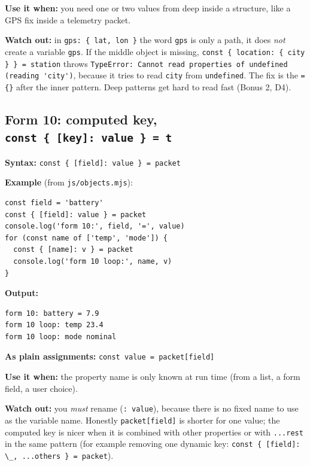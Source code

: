 \textbf{Use it when:} you need one or two values from deep inside a structure, like a GPS fix inside a telemetry packet.

\textbf{Watch out:} in \passthrough{\lstinline!gps: \{ lat, lon \}!} the word \passthrough{\lstinline!gps!} is only a path, it does \emph{not} create a variable \passthrough{\lstinline!gps!}. If the middle object is missing, \passthrough{\lstinline!const \{ location: \{ city \} \} = station!} throws \passthrough{\lstinline!TypeError: Cannot read properties of undefined (reading 'city')!}, because it tries to read \passthrough{\lstinline!city!} from \passthrough{\lstinline!undefined!}. The fix is the \passthrough{\lstinline!= \{\}!} after the inner pattern. Deep patterns get hard to read fast (Bonus 2, D4).

\hypertarget{form-10-computed-key-const--key-value---t}{%
\subsection{\texorpdfstring{Form 10: computed key, \texttt{const\ \{\ {[}key{]}:\ value\ \}\ =\ t}}{Form 10: computed key, const \{ {[}key{]}: value \} = t}}\label{form-10-computed-key-const--key-value---t}}

\textbf{Syntax:} \passthrough{\lstinline!const \{ [field]: value \} = packet!}

\textbf{Example} (from \passthrough{\lstinline!js/objects.mjs!}):

\begin{lstlisting}
const field = 'battery'
const { [field]: value } = packet
console.log('form 10:', field, '=', value)
for (const name of ['temp', 'mode']) {
  const { [name]: v } = packet
  console.log('form 10 loop:', name, v)
}
\end{lstlisting}

\textbf{Output:}

\begin{lstlisting}
form 10: battery = 7.9
form 10 loop: temp 23.4
form 10 loop: mode nominal
\end{lstlisting}

\textbf{As plain assignments:} \passthrough{\lstinline!const value = packet[field]!}

\textbf{Use it when:} the property name is only known at run time (from a list, a form field, a user choice).

\textbf{Watch out:} you \emph{must} rename (\passthrough{\lstinline!: value!}), because there is no fixed name to use as the variable name. Honestly \passthrough{\lstinline!packet[field]!} is shorter for one value; the computed key is nicer when it is combined with other properties or with \passthrough{\lstinline!...rest!} in the same pattern (for example removing one dynamic key: \passthrough{\lstinline!const \{ [field]: \_, ...others \} = packet!}).

